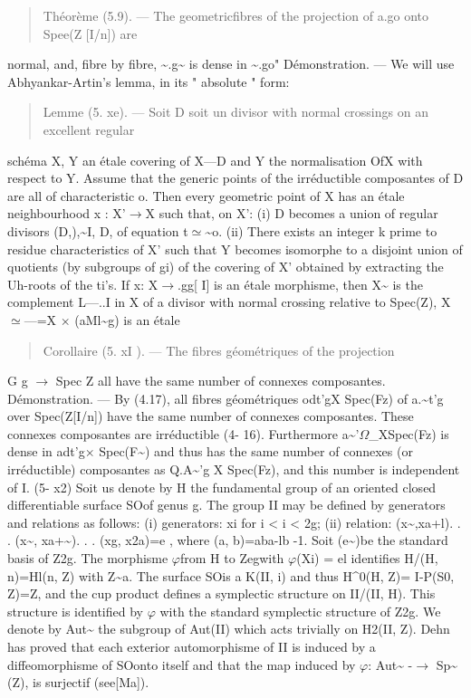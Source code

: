 \documentclass[11pt]{article}
\theoremstyle{plain}
\theoremstyle{definition}
\theoremstyle{remark}
\begin{document}
\begin{quote}Th\'eor\`eme (5.9). --- The geometricfibres of the projection of a.go onto Spee(Z [I/n]) are\end{quote}
normal, and, fibre by fibre, \textasciitilde{}.g\textasciitilde{} is dense in \textasciitilde{}.go" D\'emonstration. --- We will use Abhyankar-Artin's lemma, in its " absolute " form:

\begin{quote}Lemme (5. xe). --- Soit D soit un divisor with normal crossings on an excellent regular\end{quote}
sch\'ema X, Y an \'etale covering of X---D and Y the normalisation OfX with respect to Y. Assume that the generic points of the irr\'eductible composantes of D are all of characteristic o. Then every geometric point of X has an \'etale neighbourhood x : X'$\to$X such that, on X': (i) D becomes a union of regular divisors (D,),\textasciitilde{}I, D, of equation t$\simeq$\textasciitilde{}o. (ii) There exists an integer k prime to residue characteristics of X' such that Y becomes isomorphe to a disjoint union of quotients (by subgroups of gi) of the covering of X' obtained by extracting the Uh-roots of the ti's. If x: X$\to$.gg[ I] is an \'etale morphisme, then X\textasciitilde{} is the complement L---..I in X of a divisor with normal crossing relative to Spec(Z), X $\simeq$---=X $\times$ (aMl\textasciitilde{}g) is an \'etale

\begin{quote}Corollaire (5. xI ). --- The fibres g\'eom\'etriques of the projection\end{quote}
G g $\to$ Spec Z all have the same number of connexes composantes. D\'emonstration. --- By (4.17), all fibres g\'eom\'etriques odt'gX Spec(Fz) of a.\textasciitilde{}t'g over Spec(Z[I/n]) have the same number of connexes composantes. These connexes composantes are irr\'eductible (4- 16). Furthermore a\textasciitilde{}'$\Omega$\_XSpec(Fz) is dense in adt'g$\times$ Spec(F\textasciitilde{}) and thus has the same number of connexes (or irr\'eductible) composantes as Q.A\textasciitilde{}'g X Spec(Fz), and this number is independent of I. (5- x2) Soit us denote by H the fundamental group of an oriented closed differentiable surface SOof genus g. The group II may be defined by generators and relations as follows: (i) generators: xi for i < i < 2g; (ii) relation: (x\textasciitilde{},xa+l). . . (x\textasciitilde{}, xa+\textasciitilde{}). . . (xg, x2a)=e , where (a, b)=aba-lb -1. Soit (e\textasciitilde{})be the standard basis of Z2g. The morphisme $\varphi$from H to Zegwith $\varphi$(Xi) = el identifies H/(H, n)=Hl(n, Z) with Z\textasciitilde{}a. The surface SOis a K(II, i) and thus H\textasciicircum{}0(H, Z)= I-P(S0, Z)=Z, and the cup product defines a symplectic structure on II/(II, H). This structure is identified by $\varphi$ with the standard symplectic structure of Z2g. We denote by Aut\textasciitilde{} the subgroup of Aut(II) which acts trivially on H2(II, Z). Dehn has proved that each exterior automorphisme of II is induced by a diffeomorphisme of SOonto itself and that the map induced by $\varphi$: Aut\textasciitilde{} -$\to$ Sp\textasciitilde{}(Z), is surjectif (see[Ma]).
\end{document}
